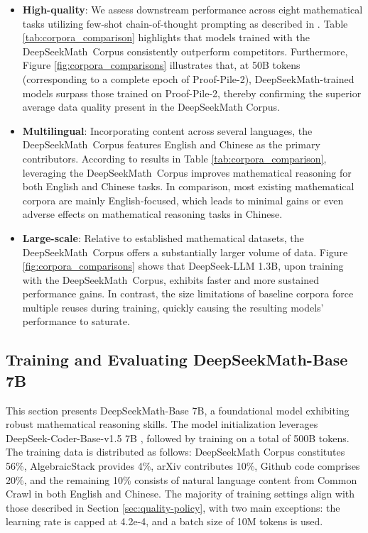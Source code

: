 \begin{itemize}[topsep=0pt]
\begin{itemize}[topsep=0pt]
    \item \textbf{High-quality}:
    We assess downstream performance across eight mathematical tasks utilizing few-shot chain-of-thought prompting as described in \cite{cot}. Table \ref{tab:corpora_comparison} highlights that models trained with the DeepSeekMath~Corpus consistently outperform competitors. Furthermore, Figure \ref{fig:corpora_comparisons} illustrates that, at 50B tokens (corresponding to a complete epoch of Proof-Pile-2), DeepSeekMath-trained models surpass those trained on Proof-Pile-2, thereby confirming the superior average data quality present in the DeepSeekMath Corpus.
    \item \textbf{Multilingual}:
    Incorporating content across several languages, the DeepSeekMath~Corpus features English and Chinese as the primary contributors. According to results in Table \ref{tab:corpora_comparison}, leveraging the DeepSeekMath~Corpus improves mathematical reasoning for both English and Chinese tasks. In comparison, most existing mathematical corpora are mainly English-focused, which leads to minimal gains or even adverse effects on mathematical reasoning tasks in Chinese.
    \item \textbf{Large-scale}:
    Relative to established mathematical datasets, the DeepSeekMath~Corpus offers a substantially larger volume of data. Figure \ref{fig:corpora_comparisons} shows that DeepSeek-LLM 1.3B, upon training with the DeepSeekMath~Corpus, exhibits faster and more sustained performance gains. In contrast, the size limitations of baseline corpora force multiple reuses during training, quickly causing the resulting models’ performance to saturate.
\end{itemize}

\subsection{Training and Evaluating DeepSeekMath-Base 7B}

This section presents DeepSeekMath-Base 7B, a foundational model exhibiting robust mathematical reasoning skills. The model initialization leverages DeepSeek-Coder-Base-v1.5 7B \citep{deepseek-coder}, followed by training on a total of 500B tokens. The training data is distributed as follows: DeepSeekMath Corpus constitutes 56\%, AlgebraicStack provides 4\%, arXiv contributes 10\%, Github code comprises 20\%, and the remaining 10\% consists of natural language content from Common Crawl in both English and Chinese. The majority of training settings align with those described in Section \ref{sec:quality-policy}, with two main exceptions: the learning rate is capped at 4.2e-4, and a batch size of 10M tokens is used.


\end{itemize}
